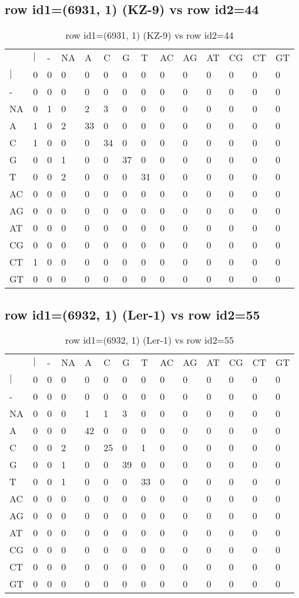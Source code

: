 \subsection{row id1=(6931, 1) (KZ-9) vs row id2=44}
\begin{center}
\begin{longtable}{|l|l|l|l|l|l|l|l|l|l|l|l|l|l|}
\caption{row id1=(6931, 1) (KZ-9) vs row id2=44} \label{table_dm124}\\
\hline
\\
\hline
&$|$&-&NA&A&C&G&T&AC&AG&AT&CG&CT&GT\\
$|$&0&0&0&0&0&0&0&0&0&0&0&0&0\\
-&0&0&0&0&0&0&0&0&0&0&0&0&0\\
NA&0&1&0&2&3&0&0&0&0&0&0&0&0\\
A&1&0&2&33&0&0&0&0&0&0&0&0&0\\
C&1&0&0&0&34&0&0&0&0&0&0&0&0\\
G&0&0&1&0&0&37&0&0&0&0&0&0&0\\
T&0&0&2&0&0&0&31&0&0&0&0&0&0\\
AC&0&0&0&0&0&0&0&0&0&0&0&0&0\\
AG&0&0&0&0&0&0&0&0&0&0&0&0&0\\
AT&0&0&0&0&0&0&0&0&0&0&0&0&0\\
CG&0&0&0&0&0&0&0&0&0&0&0&0&0\\
CT&1&0&0&0&0&0&0&0&0&0&0&0&0\\
GT&0&0&0&0&0&0&0&0&0&0&0&0&0\\
\hline
\end{longtable}
\end{center}

\subsection{row id1=(6932, 1) (Ler-1) vs row id2=55}
\begin{center}
\begin{longtable}{|l|l|l|l|l|l|l|l|l|l|l|l|l|l|}
\caption{row id1=(6932, 1) (Ler-1) vs row id2=55} \label{table_dm126}\\
\hline
\\
\hline
&$|$&-&NA&A&C&G&T&AC&AG&AT&CG&CT&GT\\
$|$&0&0&0&0&0&0&0&0&0&0&0&0&0\\
-&0&0&0&0&0&0&0&0&0&0&0&0&0\\
NA&0&0&0&1&1&3&0&0&0&0&0&0&0\\
A&0&0&0&42&0&0&0&0&0&0&0&0&0\\
C&0&0&2&0&25&0&1&0&0&0&0&0&0\\
G&0&0&1&0&0&39&0&0&0&0&0&0&0\\
T&0&0&1&0&0&0&33&0&0&0&0&0&0\\
AC&0&0&0&0&0&0&0&0&0&0&0&0&0\\
AG&0&0&0&0&0&0&0&0&0&0&0&0&0\\
AT&0&0&0&0&0&0&0&0&0&0&0&0&0\\
CG&0&0&0&0&0&0&0&0&0&0&0&0&0\\
CT&0&0&0&0&0&0&0&0&0&0&0&0&0\\
GT&0&0&0&0&0&0&0&0&0&0&0&0&0\\
\hline
\end{longtable}
\end{center}

